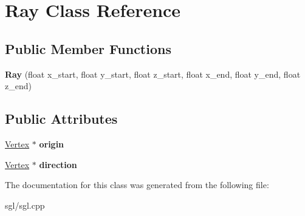 \hypertarget{class_ray}{}\section{Ray Class Reference}
\label{class_ray}
\subsection*{Public Member Functions}
\begin{DoxyCompactItemize}
\item 
\mbox{\label{class_ray_a156a9e2a3055e58a52622077a5e36f3c}} 
{\bfseries Ray} (float x\+\_\+start, float y\+\_\+start, float z\+\_\+start, float x\+\_\+end, float y\+\_\+end, float z\+\_\+end)
\end{DoxyCompactItemize}
\subsection*{Public Attributes}
\begin{DoxyCompactItemize}
\item 
\mbox{\label{class_ray_a948bb948f30f54627d9b316433cc5d69}} 
\hyperlink{class_vertex}{Vertex} $\ast$ {\bfseries origin}
\item 
\mbox{\label{class_ray_a6b0d90f41edce755b0cedab9300c4535}} 
\hyperlink{class_vertex}{Vertex} $\ast$ {\bfseries direction}
\end{DoxyCompactItemize}


The documentation for this class was generated from the following file\+:\begin{DoxyCompactItemize}
\item 
sgl/sgl.\+cpp\end{DoxyCompactItemize}
